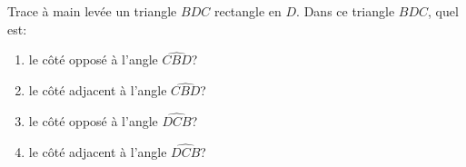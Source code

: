 
Trace à main levée un triangle $BDC$ rectangle en $D$. Dans ce triangle $BDC$, quel est:
\begin{enumerate}
\item le côté opposé à l'angle $\widehat{CBD}$?
\item le côté adjacent à l'angle $\widehat{CBD}$?
\item le côté opposé à l'angle $\widehat{DCB}$?
\item le côté adjacent à l'angle $\widehat{DCB}$?
\end{enumerate}
